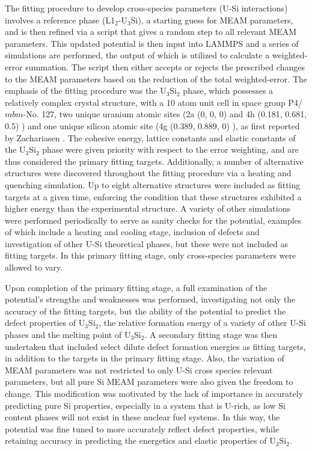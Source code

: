 \documentclass[review]{elsarticle}
\begin{document}
The fitting procedure to develop cross-species parameters (U-Si interactions) involves a reference phase (L1$_{2}$-U$_{3}$Si), a starting guess for MEAM parameters, and is then refined via a script that gives a random step to all relevant MEAM parameters.  This updated potential is then input into LAMMPS \cite{plimpton1995} and a series of simulations are performed, the output of which is utilized to calculate a weighted-error summation.  The script then either accepts or rejects the prescribed changes to the MEAM parameters based on the reduction of the total weighted-error.  The emphasis of the fitting procedure was the U$_{3}$Si$_{2}$ phase, which possesses a relatively complex crystal structure, with a 10 atom unit cell in space group P4/$\textit{mbm}$-No. 127, two unique uranium atomic sites (2a (0, 0, 0) and 4h (0.181, 0.681, 0.5) ) and one unique silicon atomic site (4g (0.389, 0.889, 0) ), as first reported by Zachariasen \cite{zachariasen1949}.  The cohesive energy, lattice constants and elastic constants of the U$_{3}$Si$_{2}$ phase were given priority with respect to the error weighting, and are thus considered the primary fitting targets.  Additionally, a number of alternative structures were discovered throughout the fitting procedure via a heating and quenching simulation.  Up to eight alternative structures were included as fitting targets at a given time, enforcing the condition that these structures exhibited a higher energy than the experimental structure.  A variety of other simulations were performed periodically to serve as sanity checks for the potential, examples of which include a heating and cooling stage, inclusion of defects and investigation of other U-Si theoretical phases, but these were not included as fitting targets.  In this primary fitting stage, only cross-species parameters were allowed to vary.  

Upon completion of the primary fitting stage, a full examination of the potential's strengths and weaknesses was performed, investigating not only the accuracy of the fitting targets, but the ability of the potential to predict the defect properties of U$_{3}$Si$_{2}$, the relative formation energy of a variety of other U-Si phases and the melting point of U$_{3}$Si$_{2}$.  A secondary fitting stage was then undertaken that included select dilute defect formation energies as fitting targets, in addition to the targets in the primary fitting stage.  Also, the variation of MEAM parameters was not restricted to only U-Si cross species relevant parameters, but all pure Si MEAM parameters were also given the freedom to change.  This modification was motivated by the lack of importance in accurately predicting pure Si properties, especially in a system that is U-rich, as low Si content phases will not exist in these nuclear fuel systems.  In this way, the potential was fine tuned to more accurately reflect defect properties, while retaining accuracy in predicting the energetics and elastic properties of U$_{3}$Si$_{2}$.  
\end{document}
